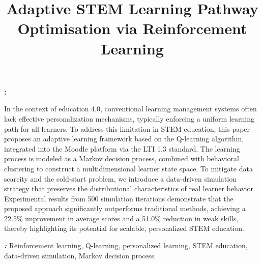 \documentclass[9pt, conference, a4paper, compsocconf]{IEEEtran}
\makeatletter
\renewenvironment{abstract}
  {\normalfont
   \@IEEEabskeysecsize
   \setlength{\parindent}{0pt}
   \noindent
   \if@twocolumn
     \bfseries\textit{\abstractname}: 
   \else
     \begin{center}\textbf{\abstractname}\end{center}
   \fi}
  {\par}
\renewenvironment{IEEEkeywords}
  {\normalfont
   \@IEEEabskeysecsize
   \vspace{0.3em}       
   \setlength{\parindent}{0pt}
   \noindent
   {\bfseries\itshape \IEEEkeywordsname: }\ignorespaces}
  {\par}
\makeatother
\begin{document}
\fontsize{9}{10}
\selectfont


\title{Adaptive STEM Learning Pathway Optimisation via Reinforcement Learning}

\author{
}

\maketitle

\begin{abstract}
In the context of education 4.0, conventional learning management systems often lack effective personalization mechanisms, typically enforcing a uniform learning path for all learners. To address this limitation in STEM education, this paper proposes an adaptive learning framework based on the Q-learning algorithm, integrated into the Moodle platform via the LTI 1.3 standard. The learning process is modeled as a Markov decision process, combined with behavioral clustering to construct a multidimensional learner state space. To mitigate data scarcity and the cold-start problem, we introduce a data-driven simulation strategy that preserves the distributional characteristics of real learner behavior. Experimental results from 500 simulation iterations demonstrate that the proposed approach significantly outperforms traditional methods, achieving a 22.5\% improvement in average scores and a 51.0\% reduction in weak skills, thereby highlighting its potential for scalable, personalized STEM education.
\end{abstract}

\begin{IEEEkeywords}
Reinforcement learning, Q-learning, personalized learning, STEM education, data-driven simulation, Markov decision process
\end{IEEEkeywords}
\end{document}
